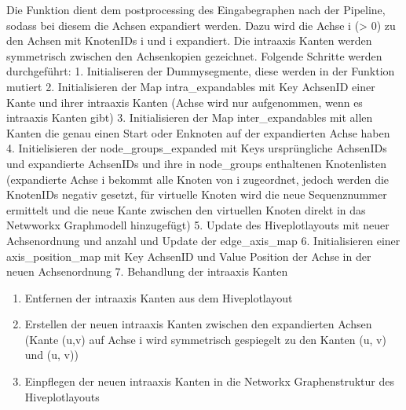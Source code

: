 \documentclass[a4paper,10pt,ngerman]{sphinxmanual}
\begin{document}
\begin{fulllineitems}
\begin{fulllineitems}
\label{\detokenize{api:src.hiveplot.HivePlotLayout.post_processing_expansion}}
\pysigstartsignatures
\pysiglinewithargsret
{}
{\sphinxparamcomma {}}
{}
\pysigstopsignatures
\sphinxAtStartPar
Die Funktion dient dem post\sphinxhyphen{}processing des Eingabegraphen nach der Pipeline, sodass bei diesem die Achsen expandiert werden. Dazu wird die Achse i (\textgreater{} 0) zu den Achsen mit KnotenIDs i und \sphinxhyphen{}i expandiert.  Die intra\sphinxhyphen{}axis Kanten werden symmetrisch zwischen den Achsenkopien gezeichnet.
Folgende Schritte werden durchgeführt:
1. Initialiseren der Dummysegmente, diese werden in der Funktion mutiert
2. Initialisieren der Map intra\_expandables mit Key AchsenID einer Kante und ihrer intra\sphinxhyphen{}axis Kanten (Achse wird nur aufgenommen, wenn es intra\sphinxhyphen{}axis Kanten gibt)
3. Initialisieren der Map inter\_expandables mit allen Kanten die genau einen Start oder Enknoten auf der expandierten Achse haben
4. Initielisieren der node\_groups\_expanded mit Keys ursprüngliche AchsenIDs und expandierte AchsenIDs und ihre in node\_groups enthaltenen Knotenlisten (expandierte Achse \sphinxhyphen{}i bekommt alle Knoten von i zugeordnet, jedoch werden die KnotenIDs negativ gesetzt, für virtuelle Knoten wird die neue Sequenznummer ermittelt und die neue Kante zwischen den virtuellen Knoten direkt in das Netwworkx Graphmodell hinzugefügt)
5. Update des Hiveplotlayouts mit neuer Achsenordnung und \sphinxhyphen{}anzahl und Update der edge\_axis\_map
6. Initialisieren einer axis\_position\_map mit Key AchsenID und Value Position der Achse in der neuen Achsenordnung
7. Behandlung der intra\sphinxhyphen{}axis Kanten
\begin{enumerate}
%
\item {} 
\sphinxAtStartPar
Entfernen der intra\sphinxhyphen{}axis Kanten aus dem Hiveplotlayout

\item {} 
\sphinxAtStartPar
Erstellen der neuen intra\sphinxhyphen{}axis Kanten zwischen den expandierten Achsen (Kante (u,v) auf Achse i wird symmetrisch gespiegelt zu den Kanten (\sphinxhyphen{}u, v) und (u, \sphinxhyphen{}v))

\item {} 
\sphinxAtStartPar
Einpflegen der neuen intra\sphinxhyphen{}axis Kanten in die Networkx Graphenstruktur des Hiveplotlayouts


\end{enumerate}
\end{fulllineitems}
\end{fulllineitems}
\end{document}
